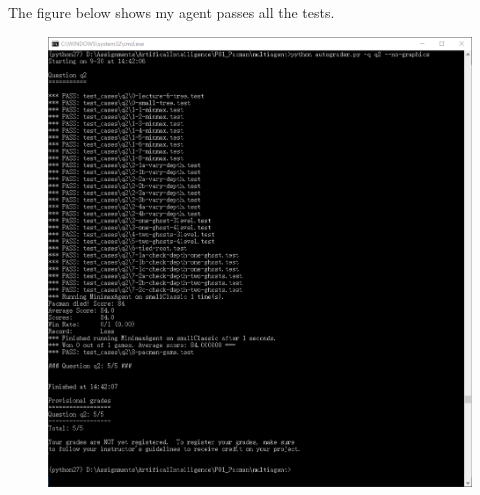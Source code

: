 \documentclass[a4paper, 11pt]{article}
\begin{document}
The figure below shows my agent passes all the tests.
\begin{figure}[H]
  \centering
  \includegraphics[width=\linewidth]{fig/Q4.png}
\end{figure}
\end{document}
